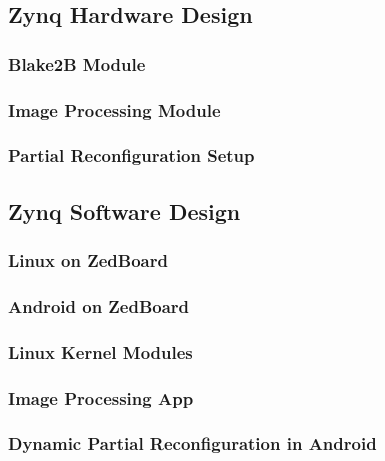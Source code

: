 \subsection{Zynq Hardware Design}\label{ssec:zynqhardwaredesign}

\subsubsection{Blake2B Module}\label{sssec:blake2bmodule}

\subsubsection{Image Processing Module}\label{sssec:imageprocessingmodule}

\subsubsection{Partial Reconfiguration Setup}\label{sssec:partialreconfigurationsetup}

\subsection{Zynq Software Design}\label{ssec:zynqsoftwaredesign}

\subsubsection{Linux on ZedBoard}\label{sssec:linuxonzedboard}

\subsubsection{Android on ZedBoard}\label{sssec:androidonzedboard}

\subsubsection{Linux Kernel Modules}\label{sssec:linuxkernelmodules}

\subsubsection{Image Processing App}\label{sssec:imageprocessingapp}

\subsubsection{Dynamic Partial Reconfiguration in Android}\label{sssec:dynamicpartialreconfiguration}

